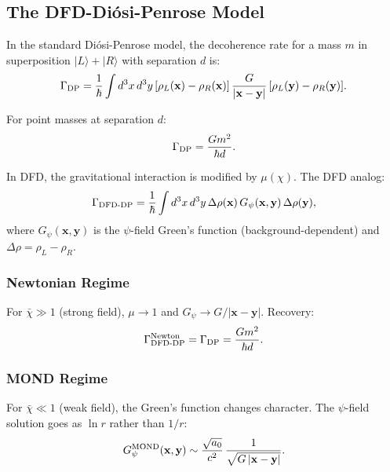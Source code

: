 \documentclass[11pt,a4paper]{article}
\begin{document}
\subsection{The DFD-Di\'{o}si-Penrose Model}
\label{sec:DFD-DP}

In the standard Di\'{o}si-Penrose model, the decoherence rate for a mass $m$ in superposition $|L\rangle + |R\rangle$ with separation $d$ is:
\begin{equation}
\Gamma_{\rm DP} = \frac{1}{\hbar}\int d^3x\,d^3y\,
[\rho_L(\mathbf{x}) - \rho_R(\mathbf{x})]\,
\frac{G}{|\mathbf{x}-\mathbf{y}|}\,
[\rho_L(\mathbf{y}) - \rho_R(\mathbf{y})].
\end{equation}

For point masses at separation $d$:
\begin{equation}
\Gamma_{\rm DP} = \frac{Gm^2}{\hbar d}.
\end{equation}

In DFD, the gravitational interaction is modified by $\mu(\chi)$. The DFD analog:
\begin{equation}\label{eq:DFD-DP}
\Gamma_{\rm DFD\text{-}DP} = \frac{1}{\hbar}\int d^3x\,d^3y\,
\Delta\rho(\mathbf{x})\,G_\psi(\mathbf{x},\mathbf{y})\,\Delta\rho(\mathbf{y}),
\end{equation}
where $G_\psi(\mathbf{x},\mathbf{y})$ is the $\psi$-field Green's function (background-dependent) and $\Delta\rho = \rho_L - \rho_R$.

\subsubsection{Newtonian Regime}

For $\bar\chi \gg 1$ (strong field), $\mu \to 1$ and $G_\psi \to G/|\mathbf{x}-\mathbf{y}|$. Recovery:
\begin{equation}
\Gamma_{\rm DFD\text{-}DP}^{\rm Newton} = \Gamma_{\rm DP} = \frac{Gm^2}{\hbar d}.
\end{equation}

\subsubsection{MOND Regime}

For $\bar\chi \ll 1$ (weak field), the Green's function changes character. The $\psi$-field solution goes as $\ln r$ rather than $1/r$:
\begin{equation}
G_\psi^{\rm MOND}(\mathbf{x},\mathbf{y}) \sim \frac{\sqrt{a_0}}{c^2}\,\frac{1}{\sqrt{G\,|\mathbf{x}-\mathbf{y}|}}.
\end{equation}
\end{document}

